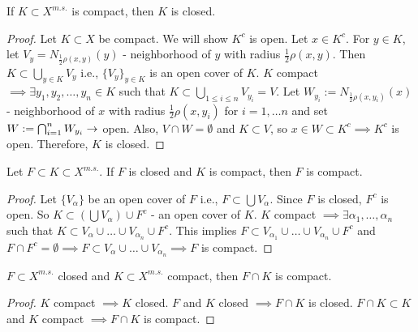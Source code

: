 \documentclass[]{article}
\begin{document}
\begin{theorem}
	If $K\subset X^{m.s.}$ is compact, then $K$ is closed. %
\end{theorem}
\begin{proof}
	Let $K\subset X$ be compact. We will show $K^c$ is open.
	Let $x\in K^c$. For $y\in K$, let $V_y = N_{\frac{1}{2}\rho(x,y)}(y)$ - neighborhood of $y$ with radius $\frac{1}{2}\rho(x,y)$.
	Then $K\subset \bigcup_{y\in K}V_y$ i.e., $\{V_y\}_{y\in K}$ is an open cover of $K$.
	$K$ compact $\implies \exists y_1,y_2,\dots,y_n\in K$ such that $K\subset \bigcup_{1\leq i\leq n} V_{y_i} = V$.
	Let $W_{y_i} := N_{\frac{1}{2}\rho(x,y_i)}(x)$ - neighborhood of $x$ with radius $\frac{1}{2}\rho(x,y_i)$ for $i = 1,\dots n$ and set $W:=\bigcap_{i=1}^n W_{y_i} \rightarrow$ open.
	Also, $V\cap W = \emptyset$ and $K\subset V$, so $x\in W\subset K^c \implies K^c$ is open.
	Therefore, $K$ is closed.
\end{proof}

\begin{theorem}
	Let $F\subset K\subset X^{m.s.}$.
	If $F$ is closed and $K$ is compact, then $F$ is compact.
\end{theorem}
\begin{proof}
	Let $\{V_\alpha\}$ be an open cover of $F$ i.e., $F\subset \bigcup V_\alpha$.
	Since $F$ is closed, $F^c$ is open. So $K\subset (\bigcup V_\alpha) \cup F^c$ - an open cover of $K$.
	$K$ compact $\implies \exists \alpha_1,\dots,\alpha_n$ such that $K\subset V_\alpha \cup\dots\cup V_{\alpha_n}\cup F^c$. This implies $F\subset V_{\alpha_1}\cup\dots\cup V_{\alpha_n}\cup F^c$ and $F\cap F^c = \emptyset \implies F\subset V_\alpha\cup\dots\cup V_{\alpha_n} \implies F$ is compact.
\end{proof}
\begin{corollary}
	$F\subset X^{m.s.}$ closed and $K\subset X^{m.s.}$ compact, then $F\cap K$ is compact.
\end{corollary}
\begin{proof}
	$K$ compact $\implies K$ closed. $F$ and $K$ closed $\implies F \cap K$ is closed.
	$F\cap K\subset K$ and $K$ compact $\implies F\cap K$ is compact.
\end{proof}
\end{document}
